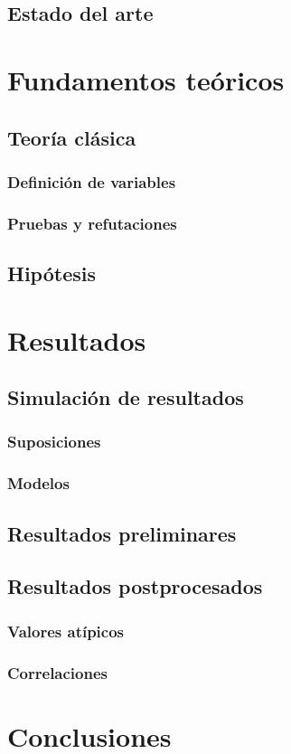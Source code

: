 \documentclass[12pt]{book}
\begin{document}
\section{Estado del arte}
\chapter{Fundamentos teóricos}
\section{Teoría clásica}
\subsection{Definición de variables}
\subsection{Pruebas y refutaciones}
\section{Hipótesis}
\chapter{Resultados}
\section{Simulación de resultados}
\subsection{Suposiciones}
\subsection{Modelos}
\section{Resultados preliminares}
\section{Resultados postprocesados}
\subsection{Valores atípicos}
\subsection{Correlaciones}
\chapter{Conclusiones}
\end{document}
